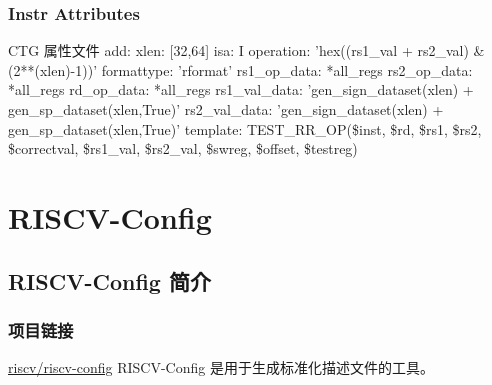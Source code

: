 \documentclass[xcolor=table,dvipsnames,svgnames,aspectratio=169]{ctexbeamer}
\begin{document}
\begin{frame}[fragile]
  \frametitle{Instr Attributes}

  \begin{codeblock}{CTG 属性文件}
add:
  xlen: [32,64]
  isa: I
  operation: 'hex((rs1_val + rs2_val) & (2**(xlen)-1))'
  formattype: 'rformat'
  rs1_op_data: *all_regs
  rs2_op_data: *all_regs
  rd_op_data: *all_regs
  rs1_val_data: 'gen_sign_dataset(xlen) + gen_sp_dataset(xlen,True)'
  rs2_val_data: 'gen_sign_dataset(xlen) + gen_sp_dataset(xlen,True)'
  template: TEST_RR_OP(\$inst, \$rd, \$rs1, \$rs2, \$correctval, \$rs1_val, \$rs2_val, \$swreg, \$offset, \$testreg)
  \end{codeblock}
\end{frame}

\section{RISCV-Config}

\subsection{RISCV-Config 简介}

\begin{frame}
  \frametitle{项目链接}

  \href{https://github.com/riscv/riscv-config}{riscv/riscv-config} RISCV-Config 是用于生成标准化描述文件的工具。

\end{frame}
\end{document}
